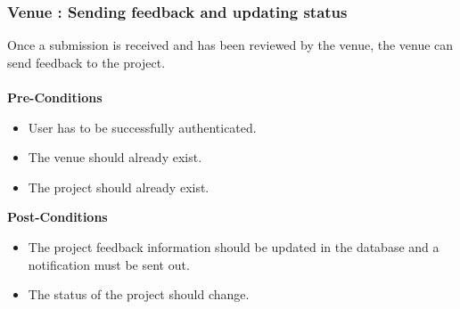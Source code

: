 \subsubsection{Venue : Sending feedback and updating status}
Once a submission is received and has been reviewed by the venue, the venue can send feedback to the project.\\ \\
\textbf{Pre-Conditions}
\begin{itemize}
	\item User has to be successfully authenticated.
	\item The venue should already exist.
	\item The project should already exist.\\
\end{itemize}
\textbf{Post-Conditions}
\begin{itemize}
	\item The project feedback information should be updated in the database and a notification must be sent out.
	\item The status of the project should change.\\
\end{itemize}